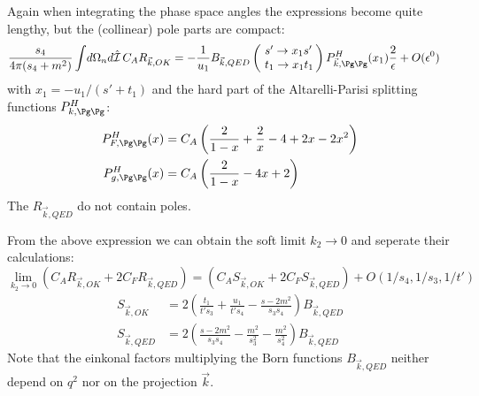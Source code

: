 Again when integrating the phase space angles the expressions become quite lengthy, but the (collinear) pole parts are compact:
\begin{align}
\frac{s_4}{4\pi(s_4+m^2)}\int\!d\Omega_n d\hat{\mathcal I}\,C_A R_{\vec k,OK} &=-\frac 1 {u_1}B_{\vec k,QED}\left(\!\begin{array}{l}s'\rightarrow x_1s'\\t_1\rightarrow x_1 t_1\end{array}\!\!\right) P^H_{\vec k,\Pg\Pg}(x_1)\frac 2 \epsilon + O(\epsilon^0) \label{eq:ROKPoles}
\end{align}
with $x_1 = -u_1/(s'+t_1)$ and the hard part of the Altarelli-Parisi splitting functions $P^H_{k,\Pg\Pg}$\cite{Altarelli:1977zs,Vogelsang:1995vh}:
\begin{align}
P^H_{F,\Pg\Pg}(x) &= C_A\left(\frac 2 {1-x} + \frac 2 x - 4 + 2x - 2x^2\right)\\
P^H_{g,\Pg\Pg}(x) &= C_A\left(\frac 2 {1-x} - 4x + 2\right)
\end{align}
The $R_{\vec k,QED}$ do not contain poles. 

From the above expression we can obtain the soft limit $k_2\rightarrow 0$ and seperate their calculations:
\begin{equation}
\lim_{k_2\rightarrow 0}\left(C_A R_{\vec k,OK} + 2C_F R_{\vec k,QED}\right) = \left(C_A S_{\vec k,OK} + 2C_F S_{\vec k,QED}\right) + O(1/s_4,1/s_3,1/t')
\end{equation}
\begin{align}
S_{\vec k,OK}  &= 2\left(\frac{t_1}{t's_3} + \frac{u_1}{t's_4}-\frac{s-2m^2}{s_3s_4}\right)B_{\vec k,QED}\\
S_{\vec k,QED} &= 2\left(\frac{s-2m^2}{s_3s_4} - \frac{m^2}{s_3^2} - \frac{m^2}{s_4^2}\right)B_{\vec k,QED}
\end{align}
Note that the einkonal factors multiplying the Born functions $B_{\vec k,QED}$ neither depend on $q^2$ nor on the projection $\vec k$. 
